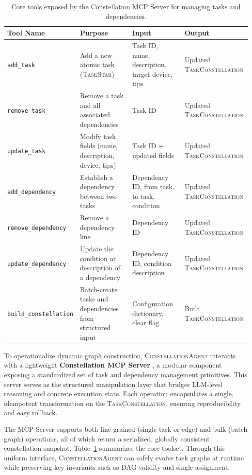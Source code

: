 \documentclass[10pt]{article} %
\newcommand{\cagent}{\textsc{ConstellationAgent}\xspace}
\newcommand{\TaskConstellation}{\textsc{TaskConstellation}\xspace}
\newcommand{\TaskStar}{\textsc{TaskStar}\xspace}
\begin{document}
\begin{table}[t]
\centering
\caption{Core tools exposed by the Constellation MCP Server for managing tasks and dependencies.}
\begin{tabular}{l p{3.5cm} p{2.5cm} p{3cm}}
\toprule
\textbf{Tool Name} & \textbf{Purpose} & \textbf{Input} & \textbf{Output} \\
\midrule
\texttt{add\_task} & Add a new atomic task (\TaskStar) & Task ID, name, description, target device, tips & Updated \TaskConstellation  \\\midrule
\texttt{remove\_task} & Remove a task and all associated dependencies & Task ID & Updated \TaskConstellation  \\\midrule
\texttt{update\_task} & Modify task fields (name, description, device, tips) & Task ID + updated fields & Updated \TaskConstellation  \\\midrule
\texttt{add\_dependency} & Establish a dependency between two tasks & Dependency ID, from task, to task, condition & Updated \TaskConstellation  \\\midrule
\texttt{remove\_dependency} & Remove a dependency line & Dependency ID & Updated \TaskConstellation  \\\midrule
\texttt{update\_dependency} & Update the condition or description of a dependency & Dependency ID, condition description & Updated \TaskConstellation  \\\midrule
\texttt{build\_constellation} & Batch-create tasks and dependencies from structured input & Configuration dictionary, clear flag & Built \TaskConstellation  \\
\bottomrule
\end{tabular}
\label{tab:mcp-tools}
\end{table}

To operationalize dynamic graph construction, \cagent interacts with a lightweight \textbf{Constellation MCP Server} \cite{hou2025model}, a modular component exposing a standardized set of task and dependency management primitives. This server serves as the structured manipulation layer that bridges LLM-level reasoning and concrete execution state. Each operation encapsulates a single, idempotent transformation on the \TaskConstellation, ensuring reproducibility and easy rollback.

The MCP Server supports both fine-grained (single task or edge) and bulk (batch graph) operations, all of which return a serialized, globally consistent constellation snapshot. Table~\ref{tab:mcp-tools} summarizes the core toolset. Through this uniform interface, \cagent can safely evolve task graphs at runtime while preserving key invariants such as DAG validity and single assignment.
\end{document}
